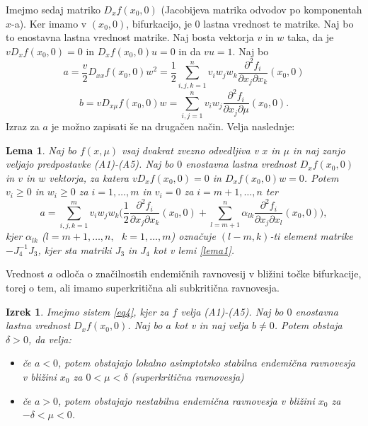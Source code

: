 \documentclass[a4paper,12pt]{article}
\newtheorem{lema}{Lema}
\newtheorem{izrek}{Izrek}
\begin{document}
Imejmo sedaj matriko \(D_xf(x_0,0)\) (Jacobijeva matrika odvodov po komponentah \(x\)-a). 
Ker imamo v \((x_0,0)\), bifurkacijo, je \(0\) lastna vrednost te matrike. Naj bo 
to enostavna lastna vrednost matrike. Naj bosta vektorja \(v\) in \(w\) taka, da je 
\(vD_xf(x_0,0)=0\) in \(D_xf(x_0,0)u=0\) in da \(vu=1\).
Naj bo 
\begin{equation}\label{eq5}
a=\frac{v}{2}D_{xx}f(x_0,0)w^2=\frac{1}{2}\sum_{i,j,k=1}^n v_iw_jw_k\frac{\partial^2f_i}{\partial x_j \partial x_k}(x_0,0)
\end{equation}
\[b=vD_{x\mu}f(x_0,0)w=\sum_{i,j=1}^n v_i w_j \frac{\partial^2 f_i}{\partial x_j \partial \mu}(x_0,0).\]
Izraz za \(a\) je možno zapisati še na drugačen način. Velja naslednje:

\begin{lema}\label{lema2}
    Naj bo \(f(x,\mu)\) vsaj dvakrat zvezno odvedljiva v 
    \(x\) in \(\mu\) in naj zanjo veljajo predpostavke (A1)-(A5).
    Naj bo \(0\) enostavna lastna vrednost \(D_xf(x_0,0)\) in \(v\) in \(w\)
    vektorja, za katera \(vD_xf(x_0,0)=0\) in \(D_xf(x_0,0)w=0\). 
    Potem \(v_i\geq 0\) in \(w_i\geq 0\) za \(i=1,\ldots, m\) in 
    \(v_i=0\) za \(i=m+1,\ldots,n\) ter 
    \[a=\sum_{i,j,k=1}^m v_i w_j w_k \big(\frac{1}{2}\frac{\partial^2 f_i}{\partial x_j \partial x_k}(x_0,0)+\sum_{l=m+1}^n \alpha_{lk}\frac{\partial^2 f_i}{\partial x_j \partial x_l}(x_0,0)\big),\]
    kjer \(\alpha_{lk}\) (\(l=m+1,\ldots,n,\textrm{ }k=1,\ldots,m\)) označuje 
    \((l-m,k)\)-ti element matrike \(-J_4^{-1}J_3\), kjer sta matriki \(J_3\) in \(J_4\)
    kot v lemi \ref{lema1}.
\end{lema}

Vrednost \(a\) odloča o značilnostih endemičnih ravnovesij v bližini točke bifurkacije, 
torej o tem, ali imamo superkritična ali subkritična ravnovesja. 

\begin{izrek}\label{izrek2}
    Imejmo sistem \ref{eq4}, kjer za \(f\) velja (A1)-(A5). Naj bo \(0\) enostavna
    lastna vrednost \(D_xf(x_0,0)\). Naj bo \(a\) kot v \label{eq5} in naj velja \(b\neq 0\).
    Potem obstaja \(\delta >0\), da velja:
    \begin{itemize}
        \item če \(a<0\), potem obstajajo lokalno asimptotsko stabilna endemična ravnovesja
        v bližini \(x_0\) za \(0<\mu <\delta\) (superkritična ravnovesja)
        \item če \(a>0\), potem obstajajo nestabilna endemična ravnovesja v bližini \(x_0\) 
        za \(-\delta < \mu < 0\).
    \end{itemize}
\end{izrek}
\end{document}
